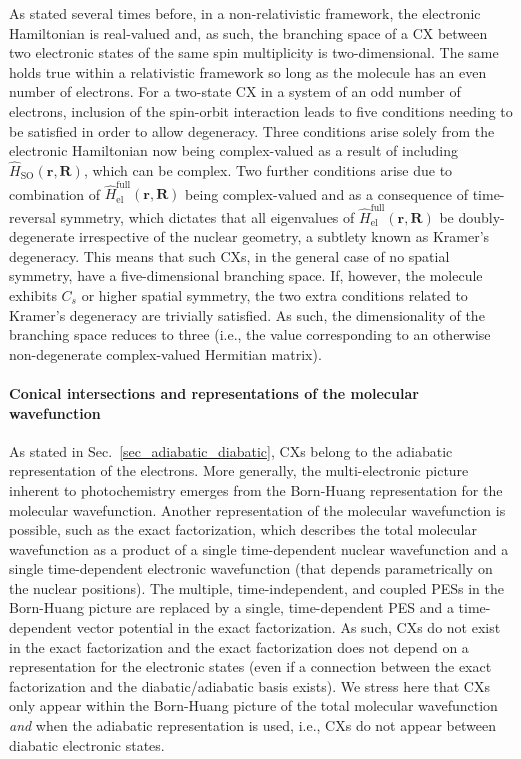 \documentclass[9pt,bestpractices]{livecoms}
\newcommand{\R}{\mathbf{R}}
\newcommand{\re}{\mathbf{r}}
\begin{document}
As stated several times before, in a non-relativistic framework, the electronic Hamiltonian is real-valued and, as such, the branching space of a CX between two electronic states of the same spin multiplicity is two-dimensional.
The same holds true within a relativistic framework so long as the molecule has an even number of electrons.
For a two-state CX in a system of an odd number of electrons, inclusion of the spin-orbit interaction leads to five conditions needing to be satisfied in order to allow degeneracy.\cite{matsika2001effects1, matsika2001effects2, matsika2002spin, han2003properties}
Three conditions arise solely from the electronic Hamiltonian now being complex-valued as a result of including $\hat{H}_{\text{SO}}(\re,\R)$, which can be complex.\cite{mead1979noncrossing}
Two further conditions arise due to combination of $\hat{H}_{\text{el}}^\text{full}(\re,\R)$ being complex-valued and as a consequence of time-reversal symmetry, which dictates that all eigenvalues of $\hat{H}_{\text{el}}^\text{full}(\re,\R)$ be doubly-degenerate irrespective of the nuclear geometry, a subtlety known as Kramer’s degeneracy.\cite{kramers1930theorie}
This means that such CXs, in the general case of no spatial symmetry, have a five-dimensional branching space.
If, however, the molecule exhibits $C_s$ or higher spatial symmetry, the two extra conditions related to Kramer’s degeneracy are trivially satisfied.
As such, the dimensionality of the branching space reduces to three (i.e., the value corresponding to an otherwise non-degenerate complex-valued Hermitian matrix).\cite{matsika2001effects1}

\paragraph{Conical intersections and representations of the molecular wavefunction}
As stated in Sec.~\ref{sec_adiabatic_diabatic}, CXs belong to the adiabatic representation of the electrons. More generally, the multi-electronic picture inherent to photochemistry emerges from the Born-Huang representation for the molecular wavefunction. Another representation of the molecular wavefunction is possible, such as the exact factorization, which describes the total molecular wavefunction as a product of a single time-dependent nuclear wavefunction and a single time-dependent electronic wavefunction (that depends parametrically on the nuclear positions).\cite{abedi_exact_2010,abedi_correlated_2012} The multiple, time-independent, and coupled PESs in the Born-Huang picture are replaced by a single, time-dependent PES and a time-dependent vector potential in the exact factorization.\cite{abedisteps} As such, CXs do not exist in the exact factorization\cite{curchod_dynamics_2017,agostini_when_2018} and the exact factorization does not depend on a representation for the electronic states (even if a connection between the exact factorization and the diabatic/adiabatic basis exists\cite{schurger2025efbh}). We stress here that CXs only appear within the Born-Huang picture of the total molecular wavefunction \textit{and} when the adiabatic representation is used, i.e., CXs do not appear between diabatic electronic states.
\end{document}
